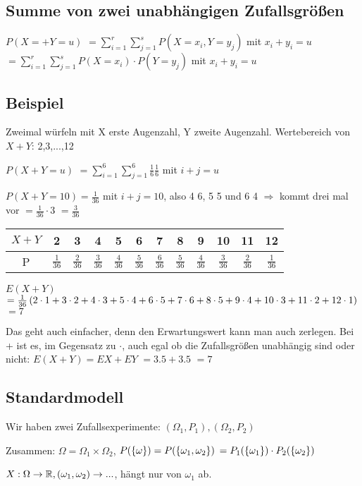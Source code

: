 \renewcommand{\ldate}{2015-11-30}

\subsection{Summe von zwei unabhängigen Zufallsgrößen}
$P(X=+Y=u)$
$=\sum_{i=1}^{r} \sum_{j=1}^{s} P(X=x_i, Y=y_j)$ mit $x_i + y_i = u$
$=\sum_{i=1}^{r} \sum_{j=1}^{s} P(X=x_i) \cdot P(Y=y_j)$ mit $x_i + y_i = u$

\subsection{Beispiel} 
Zweimal würfeln mit X erste Augenzahl, Y zweite Augenzahl. 
Wertebereich von $X+Y$: 2,3,...,12

$P(X+Y = u)$
$=\sum_{i=1}^{6} \sum_{j=1}^{6} \frac{1}{6} \frac{1}{6}$ mit $i+j=u$ 

$P(X+Y=10) = \frac{1}{36}$ mit $i+j=10$, also 4 6, 5 5 und 6 4 $\Rightarrow$ kommt drei mal vor
$=\frac{1}{36} \cdot 3 $
$=\frac{3}{36}$

\begin{tabular}{|c|c|c|c|c|c|c|c|c|c|c|c|}
\hline $X+Y$ & 2 & 3 & 4 & 5 & 6 & 7 & 8 & 9 & 10 & 11 & 12 \\ 
\hline P & $\frac{1}{36}$ & $\frac{2}{36}$ & $\frac{3}{36}$ & $\frac{4}{36}$ & $\frac{5}{36}$ & $\frac{6}{36}$ & $\frac{5}{36}$ & $\frac{4}{36}$ & $\frac{3}{36}$ & $\frac{2}{36}$ & $\frac{1}{36}$ \\ 
\hline 
\end{tabular} 

$E(X+Y)$
$=\frac{1}{36}  \left( 2\cdot 1 +  3\cdot 2+4\cdot 3+5\cdot 4+6\cdot 5+7\cdot 6+8\cdot 5+9\cdot 4+10\cdot 3 + 11\cdot 2 + 12\cdot 1 \right) $
$=7$

Das geht auch einfacher, denn den Erwartungswert kann man auch zerlegen. Bei + ist es, im Gegensatz zu $\cdot$, auch egal ob die Zufallsgrößen unabhängig sind oder nicht: 
$E(X+Y) = EX + EY$
$=3.5+3.5$
$=7$

\subsection{Standardmodell}
Wir haben zwei Zufallsexperimente: $(\Omega_1,P_1), (\Omega_2,P_2)$

Zusammen: $\Omega = \Omega_1 \times \Omega_2$, 
$P( \left\lbrace \omega \right\rbrace ) = P( \left\lbrace \omega_1, \omega_2 \right\rbrace )$
$=P_1( \left\lbrace \omega_1 \right\rbrace ) \cdot P_2( \left\lbrace \omega_2 \right\rbrace )$

$X: \Omega \rightarrow \mathbb{R}, (\omega_1, \omega_2) \rightarrow ...$, hängt nur von $\omega_1$ ab.

